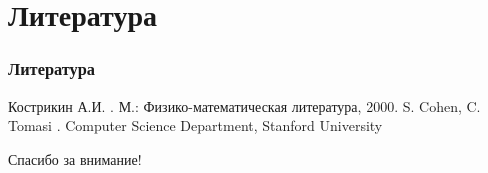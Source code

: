 \documentclass[russian,hyperref={unicode}]{beamer}
\begin{document}
\section{Литература}
\frame
{
	\frametitle{Литература}
	\begin{thebibliography}{10}
	\beamertemplatebookbibitems
    	Кострикин А.И. 
    	.
    	\newblock М.: Физико-математическая литература, 2000.
	\beamertemplatearticlebibitems
    	S. Cohen, C. Tomasi
    	.
    	\newblock Computer Science Department, Stanford University
    \end{thebibliography}
}
\frame
{
	\begin{center}
		\huge Спасибо за внимание!
	\end{center}
}
\end{document}
